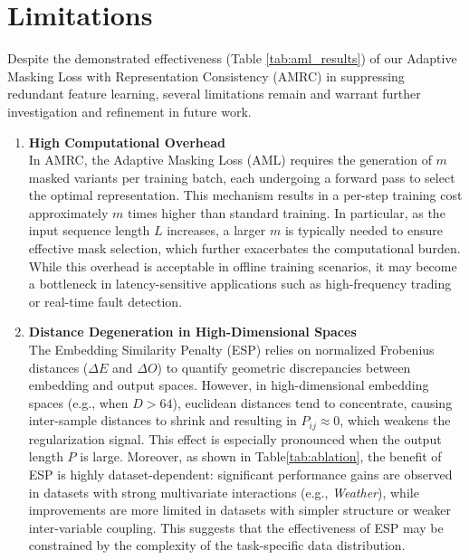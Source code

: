 \documentclass{article}
\begin{document}
\label{gen_inst}

\section{Limitations}
Despite the demonstrated effectiveness (Table \ref{tab:aml_results}) of our Adaptive Masking Loss with Representation Consistency (AMRC) in suppressing redundant feature learning, several limitations remain and warrant further investigation and refinement in future work.

\begin{enumerate}
    \item \textbf{High Computational Overhead} \\
    In AMRC, the Adaptive Masking Loss (AML) requires the generation of $m$ masked variants per training batch, each undergoing a forward pass to select the optimal representation. This mechanism results in a per-step training cost approximately $m$ times higher than standard training. In particular, as the input sequence length $L$ increases, a larger $m$ is typically needed to ensure effective mask selection, which further exacerbates the computational burden. While this overhead is acceptable in offline training scenarios, it may become a bottleneck in latency-sensitive applications such as high-frequency trading or real-time fault detection.
    
    \item \textbf{Distance Degeneration in High-Dimensional Spaces} \\
    The Embedding Similarity Penalty (ESP) relies on normalized Frobenius distances ($\Delta E$ and $\Delta O$) to quantify geometric discrepancies between embedding and output spaces. However, in high-dimensional embedding spaces (e.g., when $D > 64$), euclidean distances tend to concentrate, causing inter-sample distances to shrink and resulting in $P_{ij} \approx 0$, which weakens the regularization signal. This effect is especially pronounced when the output length $P$ is large. Moreover, as shown in Table\ref{tab:ablation}, the benefit of ESP is highly dataset-dependent: significant performance gains are observed in datasets with strong multivariate interactions (e.g., \textit{Weather}), while improvements are more limited in datasets with simpler structure or weaker inter-variable coupling. This suggests that the effectiveness of ESP may be constrained by the complexity of the task-specific data distribution.
    

\end{enumerate}
\end{document}
